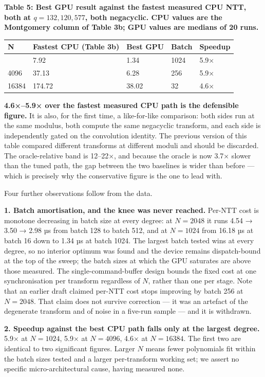 \textbf{Table 5: Best GPU result against the fastest measured CPU NTT, both at \(q = 132{,}120{,}577\), both negacyclic. CPU values are the Montgomery column of Table 3b; GPU values are medians of 20 runs.}

{\def\LTcaptype{none} %
\begin{longtable}[]{@{}lllll@{}}
\toprule\noalign{}
N & Fastest CPU (Table 3b) & Best GPU & Batch & Speedup \\
\midrule\noalign{}
\endhead
\bottomrule\noalign{}
\endlastfoot
1024 & 7.92 & 1.34 & 1024 & 5.9× \\
4096 & 37.13 & 6.28 & 256 & 5.9× \\
16384 & 174.72 & 38.02 & 32 & 4.6× \\
\end{longtable}
}

\textbf{4.6×--5.9× over the fastest measured CPU path is the defensible figure.} It is also, for the first time, a like-for-like comparison: both sides run at the same modulus, both compute the same negacyclic transform, and each side is independently gated on the convolution identity. The previous version of this table compared different transforms at different moduli and should be discarded. The oracle-relative band is 12--22×, and because the oracle is now 3.7× slower than the tuned path, the gap between the two baselines is wider than before --- which is precisely why the conservative figure is the one to lead with.

Four further observations follow from the data.

\textbf{1. Batch amortisation, and the knee was never reached.} Per-NTT cost is monotone decreasing in batch size at every degree: at \(N = 2048\) it runs 4.54 → 3.50 → 2.98 µs from batch 128 to batch 512, and at \(N = 1024\) from 16.18 µs at batch 16 down to 1.34 µs at batch 1024. The largest batch tested wins at every degree, so no interior optimum was found and the device remains dispatch-bound at the top of the sweep; the batch sizes at which the GPU saturates are above those measured. The single-command-buffer design bounds the fixed cost at one synchronisation per transform regardless of \(N\), rather than one per stage. Note that an earlier draft claimed per-NTT cost stops improving by batch 256 at \(N = 2048\). That claim does not survive correction --- it was an artefact of the degenerate transform and of noise in a five-run sample --- and it is withdrawn.

\textbf{2. Speedup against the best CPU path falls only at the largest degree.} 5.9× at \(N = 1024\), 5.9× at \(N = 4096\), 4.6× at \(N = 16384\). The first two are identical to two significant figures. Larger \(N\) means fewer polynomials fit within the batch sizes tested and a larger per-transform working set; we assert no specific micro-architectural cause, having measured none.

